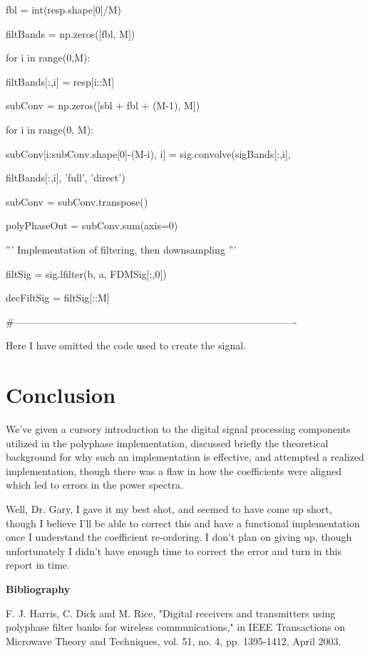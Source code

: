 \documentclass{report}
\begin{document}
fbl = int(resp.shape[0]/M)

filtBands = np.zeros([fbl, M])

for i in range(0,M):

    filtBands[:,i] = resp[i::M]
    
subConv = np.zeros([sbl + fbl + (M-1), M])

for i in range(0, M):

    subConv[i:subConv.shape[0]-(M-i), i] = sig.convolve(sigBands[:,i], 
    
            filtBands[:,i], 'full', 'direct')
            
subConv = subConv.transpose()

polyPhaseOut = subConv.sum(axis=0)

'''
Implementation of filtering, then downsampling
'''

filtSig = sig.lfilter(b, a, FDMSig[:,0])

decFiltSig = filtSig[::M]

\#-------------------------------------------------------------------------------------

Here I have omitted the code used to create the signal.

\chapter{Conclusion}

We've given a cursory introduction to the digital signal processing components utilized in the polyphase implementation, discussed briefly the theoretical background for why such an implementation is effective, and attempted a realized implementation, though there was a flaw in how the coefficients were aligned which led to errors in the power spectra.

Well, Dr. Gary, I gave it my best shot, and seemed to have come up short, though I believe I'll be able to correct this and have a functional implementation once I understand the coefficient re-ordering.  I don't plan on giving up, though unfortunately I didn't have enough time to correct the error and turn in this report in time.  

\newpage

\textbf{Bibliography}

F. J. Harris, C. Dick and M. Rice, "Digital receivers and transmitters using polyphase filter banks for wireless communications," in IEEE Transactions on Microwave Theory and Techniques, vol. 51, no. 4, pp. 1395-1412, April 2003.
\end{document}
